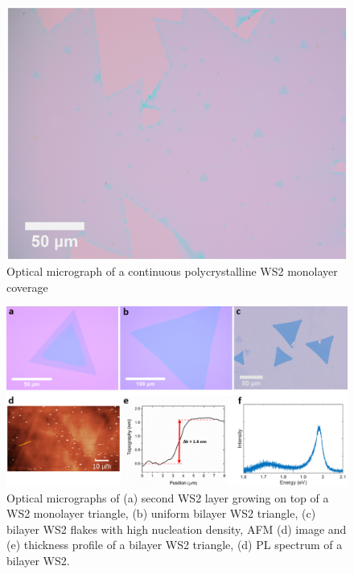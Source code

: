 \documentclass[12pt]{article}
\begin{document}
{\begin{figure}[h]
\begin{center}
\includegraphics[scale=0.3]{PaperSIOpticalContinous.png}
\caption{Optical micrograph of a continuous polycrystalline WS2 monolayer coverage}
\label{fig:PaperSIOpticalContinous}
\end{center}
\end{figure}

\begin{figure}[h]
\begin{center}
\includegraphics[scale=0.3]{PaperSIOpticalAFM.png}
\caption{Optical micrographs of (a) second WS2 layer growing on top of a WS2 monolayer triangle, (b) uniform bilayer WS2 triangle, (c) bilayer WS2 flakes with high nucleation density, AFM (d) image and (e) thickness profile of a bilayer WS2 triangle, (d) PL spectrum of a bilayer WS2.}
\label{fig:PaperSIOpticalAFM}
\end{center}
\end{figure}

}
\end{document}
